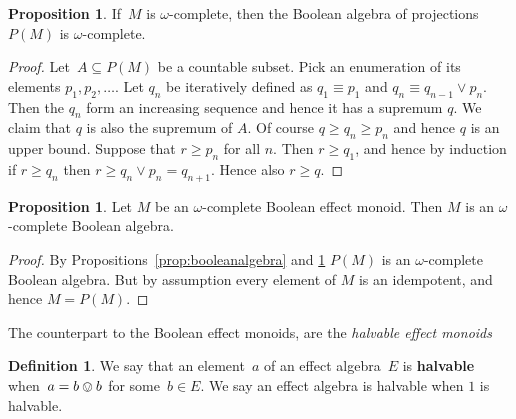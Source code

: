 \documentclass[10pt,conference]{IEEEtran}
\newcommand\Define[1]{\textbf{#1}}
\newcounter{counter}
\theoremstyle{definition}
\newtheorem{proposition}[counter]{Proposition}
\newtheorem{definition}[counter]{Definition}
\begin{document}
\begin{proposition}\label{prop:completelattice}
If~$M$ is $\omega$-complete,
    then the Boolean algebra of projections~$P(M)$ is $\omega$-complete.
\end{proposition}
\begin{proof}
    Let~$A \subseteq P(M)$ be a countable subset. Pick an enumeration of 
    its elements $p_1,p_2,\ldots$. Let $q_n$ be iteratively defined
    as $q_1 \equiv p_1$ and $q_n \equiv q_{n-1}\vee p_n$.
    Then the $q_n$ form an increasing sequence and hence it has
    a supremum $q$. We claim that $q$ is also the supremum of $A$.
    Of course $q\geq q_n \geq p_n$ and hence $q$ is an upper bound.
    Suppose that $r\geq p_n$ for all $n$. Then $r\geq q_1$, and hence by induction
    if $r\geq q_n$ then $r\geq q_n \vee p_n = q_{n+1}$. Hence also $r\geq q$. \qedhere
    
\end{proof}


\begin{proposition}\label{prop:sharpeffectmonoidisbooleanalgebra}
    Let $M$ be an $\omega$-complete Boolean effect monoid. 
    Then $M$ is an $\omega$-complete Boolean algebra.
\end{proposition}
\begin{proof}
    By Propositions~\ref{prop:booleanalgebra} and \ref{prop:completelattice} 
    $P(M)$ is an $\omega$-complete Boolean algebra. 
    But by assumption every element of $M$ is an idempotent, and hence $M=P(M)$.
\end{proof}

The counterpart to the Boolean effect monoids, are the \emph{halvable effect monoids}
\begin{definition}
We say that an element~$a$ of an effect algebra~$E$
    is \Define{halvable}
    when~$a=b\ovee b$ for some~$b\in E$. We say an effect algebra
    is halvable when $1$ is halvable.
\end{definition}
\end{document}
